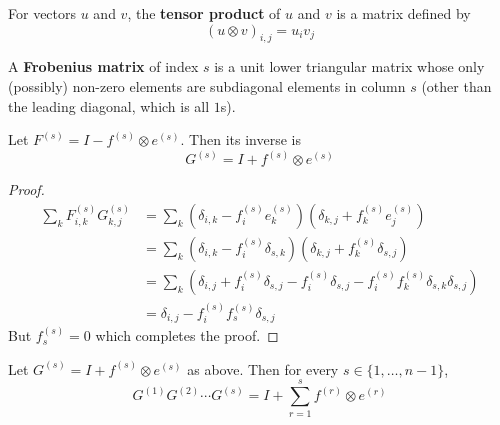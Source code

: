 \begin{definition}
	For vectors $u$ and $v$, the \textbf{tensor product} of $u$ and $v$ is a matrix defined by
	\[
		{(u \otimes v)}_{i, j} = u_i v_j
	\]
\end{definition}

\begin{definition}
	A \textbf{Frobenius matrix} of index $s$ is a unit lower triangular matrix whose only (possibly) non-zero elements are subdiagonal elements in column $s$ (other than the leading diagonal, which is all $1$s).
\end{definition}

\begin{lemma}\label{lem:GFinverse}
	Let $F^{(s)} = I - f^{(s)} \otimes e^{(s)}$. Then its inverse is
	\[
		G^{(s)} = I + f^{(s)} \otimes e^{(s)}
	\]
\end{lemma}

\begin{proof}
	\[
		\begin{aligned}
			\sum_k F_{i, k}^{(s)} G_{k, j}^{(s)}
				& = \sum_k \left( \delta_{i, k} - f_i^{(s)} e_k^{(s)} \right) \left( \delta_{k, j} + f_k^{(s)} e_j^{(s)} \right) \\
				& = \sum_k \left( \delta_{i, k} - f_i^{(s)} \delta_{s, k} \right) \left( \delta_{k, j} + f_k^{(s)} \delta_{s, j} \right) \\
				& = \sum_k \left( \delta_{i, j} + f_i^{(s)} \delta_{s, j} - f_i^{(s)} \delta_{s, j} - f_i^{(s)} f_k^{(s)} \delta_{s, k} \delta_{s, j} \right) \\
				& = \delta_{i, j} - f_i^{(s)} f_s^{(s)} \delta_{s, j}
		\end{aligned}
	\]
	But $f_s^{(s)} = 0$ which completes the proof.
\end{proof}

\begin{lemma}
	Let $G^{(s)} = I + f^{(s)} \otimes e^{(s)}$ as above. Then for every $s \in \{ 1, \dots, n - 1 \}$,
	\[
		G^{(1)} G^{(2)} \cdots G^{(s)} = I + \sum_{r = 1}^{s} f^{(r)} \otimes e^{(r)}
	\]
\end{lemma}

